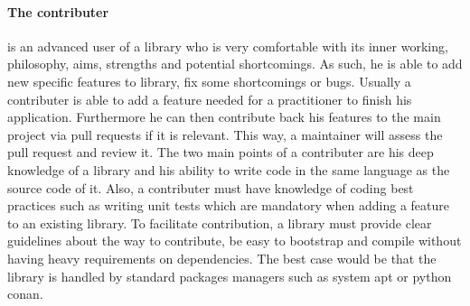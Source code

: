 \paragraph{The contributer} is an advanced user of a library who is very comfortable with its inner working, philosophy,
aims, strengths and potential shortcomings. As such, he is able to add new specific features to library, fix some
shortcomings or bugs. Usually a contributer is able to add a feature needed for a practitioner to finish his
application. Furthermore he can then contribute back his features to the main project via pull requests if it is
relevant. This way, a maintainer will assess the pull request and review it. The two main points of a contributer are
his deep knowledge of a library and his ability to write code in the same language as the source code of it. Also, a
contributer must have knowledge of coding best practices such as writing unit tests which are mandatory when adding a
feature to an existing library. To facilitate contribution, a library must provide clear guidelines about the way to
contribute, be easy to bootstrap and compile without having heavy requirements on dependencies. The best case would be
that the library is handled by standard packages managers such as system apt or python conan.

